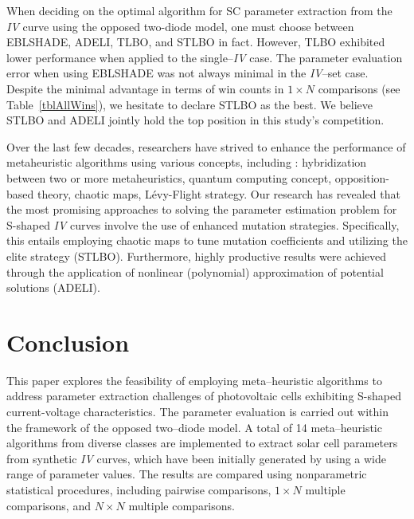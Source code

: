 \documentclass[a4paper,fleqn]{cas-sc}
\begin{document}
When deciding on the optimal algorithm for SC parameter extraction from 
the \emph{IV} curve using the opposed two-diode model, 
one must choose between EBLSHADE, ADELI, TLBO, and STLBO in fact.
However, TLBO exhibited lower performance when applied to the single--\emph{IV} case.
The parameter evaluation error when using EBLSHADE was not always minimal in the \emph{IV}--set case.
Despite the minimal advantage in terms of win counts in $1\times N$ comparisons
(see Table~\ref{tblAllWins}),
we hesitate to declare STLBO as the best.
We believe STLBO and ADELI jointly hold the top position in this study's competition.


Over the last few decades, researchers have strived to enhance the performance of metaheuristic algorithms using various concepts, including \cite{Kepler}:
hybridization between two or more metaheuristics, quantum computing concept, opposition-based theory, chaotic maps,  L\'{e}vy-Flight strategy.
Our research has revealed that the most promising approaches to solving
the parameter estimation problem for S-shaped \emph{IV} curves involve the use of enhanced mutation strategies.
Specifically, this entails employing chaotic maps to tune mutation coefficients and utilizing the elite strategy (STLBO).
Furthermore, highly productive results were achieved through the application of nonlinear (polynomial) approximation of potential solutions (ADELI).




\section{Conclusion}\label{SecConsl}

This paper explores the feasibility of employing meta--heuristic algorithms 
to address parameter extraction challenges of photovoltaic cells 
exhibiting S-shaped current-voltage characteristics. 
The parameter evaluation is carried out within the framework of the opposed two--diode model. 
A total of 14 meta--heuristic algorithms from diverse classes are implemented 
to extract solar cell parameters from synthetic \emph{IV} curves, 
which have been initially generated by using a wide range of parameter values. 
The results are compared using nonparametric statistical procedures, 
including pairwise comparisons,  $1\times N$ multiple comparisons, and $N\times N$ multiple comparisons.
\end{document}
